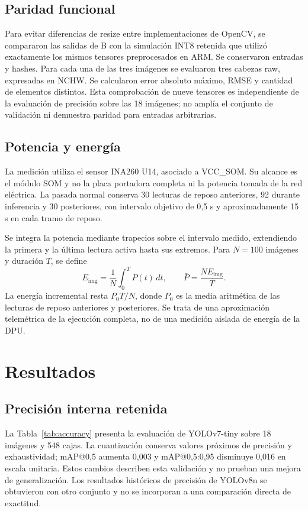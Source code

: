 \documentclass[10pt,conference,a4paper]{elektron}
\begin{document}
\subsection{Paridad funcional}
Para evitar diferencias de resize entre implementaciones de OpenCV, se compararon las salidas de B con la simulación INT8 retenida que utilizó exactamente los mismos tensores preprocesados en ARM. Se conservaron entradas y hashes. Para cada una de las tres imágenes se evaluaron tres cabezas raw, expresadas en NCHW. Se calcularon error absoluto máximo, RMSE y cantidad de elementos distintos. Esta comprobación de nueve tensores es independiente de la evaluación de precisión sobre las 18 imágenes; no amplía el conjunto de validación ni demuestra paridad para entradas arbitrarias.

\subsection{Potencia y energía}
La medición utiliza el sensor INA260 U14, asociado a VCC\_SOM. Su alcance es el módulo SOM y no la placa portadora completa ni la potencia tomada de la red eléctrica. La pasada normal conserva 30 lecturas de reposo anteriores, 92 durante inferencia y 30 posteriores, con intervalo objetivo de 0,5 s y aproximadamente 15 s en cada tramo de reposo.

Se integra la potencia mediante trapecios sobre el intervalo medido, extendiendo la primera y la última lectura activa hasta sus extremos. Para $N=100$ imágenes y duración $T$, se define
\begin{equation}
E_{\mathrm{img}}=\frac{1}{N}\int_0^T P(t)\,dt,\qquad
\bar P=\frac{N E_{\mathrm{img}}}{T}.
\end{equation}
La energía incremental resta $P_0T/N$, donde $P_0$ es la media aritmética de las lecturas de reposo anteriores y posteriores. Se trata de una aproximación telemétrica de la ejecución completa, no de una medición aislada de energía de la DPU.

\section{Resultados}
\subsection{Precisión interna retenida}
La Tabla~\ref{tab:accuracy} presenta la evaluación de YOLOv7-tiny sobre 18 imágenes y 548 cajas. La cuantización conserva valores próximos de precisión y exhaustividad; mAP@0,5 aumenta 0,003 y mAP@0,5:0,95 disminuye 0,016 en escala unitaria. Estos cambios describen esta validación y no prueban una mejora de generalización. Los resultados históricos de precisión de YOLOv8n se obtuvieron con otro conjunto y no se incorporan a una comparación directa de exactitud.
\end{document}
